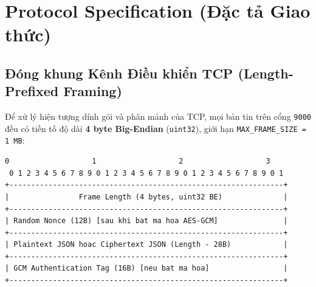 \section{Protocol Specification (Đặc tả Giao thức)}

\subsection{Đóng khung Kênh Điều khiển TCP (Length-Prefixed Framing)}
Để xử lý hiện tượng dính gói và phân mảnh của TCP, mọi bản tin trên cổng \texttt{9000} đều có tiền tố độ dài \textbf{4 byte Big-Endian} (\texttt{uint32}), giới hạn \texttt{MAX\_FRAME\_SIZE = 1 MB}:

\begin{lstlisting}[numbers=none]
 0                   1                   2                   3
 0 1 2 3 4 5 6 7 8 9 0 1 2 3 4 5 6 7 8 9 0 1 2 3 4 5 6 7 8 9 0 1
+---------------------------------------------------------------+
|                Frame Length (4 bytes, uint32 BE)              |
+---------------------------------------------------------------+
| Random Nonce (12B) [sau khi bat ma hoa AES-GCM]               |
+---------------------------------------------------------------+
| Plaintext JSON hoac Ciphertext JSON (Length - 28B)            |
+---------------------------------------------------------------+
| GCM Authentication Tag (16B) [neu bat ma hoa]                 |
+---------------------------------------------------------------+
\end{lstlisting}

